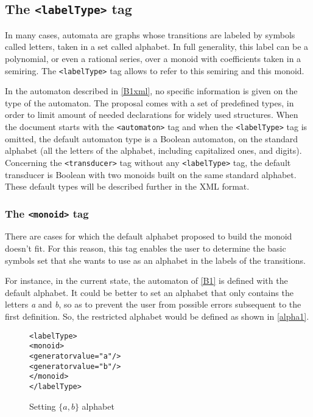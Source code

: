 \documentclass[a4paper]{article}
\newcommand{\xtag}[1]{\texttt{<#1>}}
\begin{document}
\subsection{The \xtag{labelType} tag}

In many cases, automata are graphs whose transitions are labeled by
symbols called letters, taken in a set called alphabet. In full
generality, this label can be a polynomial, or even a rational series,
over a monoid with coefficients taken in a semiring. The \xtag{labelType}
tag allows to refer to this semiring and this monoid.

In the automaton described in \autoref{B1xml}, no specific information
is given on the type of the automaton. The proposal comes with a set
of predefined types, in order to limit amount of needed declarations
for widely used structures. When the document starts with the
\xtag{automaton} tag and when the \xtag{labelType} tag is omitted, the
default automaton type is a Boolean automaton, on the standard
alphabet (all the letters of the alphabet, including capitalized ones,
and digits).  Concerning the \xtag{transducer} tag without any
\xtag{labelType} tag, the default transducer is Boolean with two monoids
built on the same standard alphabet.  These default types will be
described further in the XML format.


\subsubsection{The \xtag{monoid} tag}

There are cases for which the default alphabet proposed to build the
monoid doesn't fit. For this reason, this tag enables the user to
determine the basic symbols set that she wants to use as an alphabet
in the labels of the transitions.

For instance, in the current state, the automaton of \autoref{B1} is
defined with the default alphabet. It could be better to set an
alphabet that only contains the letters \textit{a} and \textit{b}, so
as to prevent the user from possible errors subsequent to the first
definition. So, the restricted alphabet would be defined as shown in
\autoref{alpha1}.

\begin{figure}[ht]
  \small
  \begin{center}
\begin{alltt}
<labelType>
  <monoid>
     <generator value="a"/>
     <generator value="b"/>
  </monoid>
</labelType>
\end{alltt}

\caption{Setting $\{a, b\}$ alphabet}
\label{alpha1}
  \end{center}
\end{figure}
\end{document}
